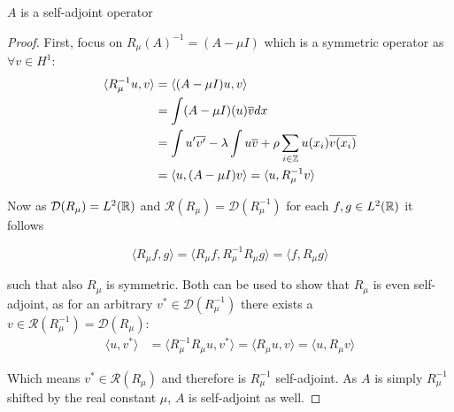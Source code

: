 \begin{theorem}
	$A$ is a self-adjoint operator
		
	\begin{proof}
		First, focus on $R_{\mu}(A)^{-1} = (A - \mu I)$ which is a symmetric operator as $\forall v \in H^{1}$:
			\begin{align*}
				\langle R_{\mu}^{-1} u, v \rangle & = \langle (A - \mu I) u, v \rangle \\
					& = \int (A - \mu I)(u) \overline{v} dx \\
					& = \int u'\overline{v'} -  \lambda \int u \overline{v} + \rho \sum_{i \in \mathbb{Z}} u(x_{i}) \overline{v(x_{i})} \\
					& = \langle u, (A - \mu I) v \rangle = \langle u,  R_{\mu}^{-1} v \rangle 
			\end{align*}

		Now as $\mathcal{D}(R_{\mu}) = L^{2}(\mathbb{R})$ and $\mathcal{R}(R_{\mu}) = \mathcal{D}(R_{\mu}^{-1})$ for each $f, g \in L^{2}(\mathbb{R})$ it follows
		
		\[  \langle R_{\mu} f, g \rangle =  \langle R_{\mu} f, R_{\mu}^{-1} R_{\mu} g \rangle = \langle f, R_{\mu} g \rangle \]
		
		such that also $R_{\mu}$ is symmetric. Both can be used to show that $R_{\mu}$ is even self-adjoint, as for an arbitrary $v^{*} \in \mathcal{D}(R_{\mu}^{-1})$ there exists a $v \in \mathcal{R}(R_{\mu}^{-1}) = \mathcal{D}(R_{\mu})$:
		\begin{align*}
			\langle u, v^{*} \rangle & = \langle R_{\mu}^{-1} R_{\mu} u , v^{*} \rangle = \langle R_{\mu} u, v \rangle  = \langle  u, R_{\mu} v \rangle 
		\end{align*}
		
		Which means $v^{*} \in \mathcal{R}(R_{\mu})$ and therefore is $R_{\mu}^{-1}$  self-adjoint. As $A$ is simply $R_{\mu}^{-1}$ shifted by the real constant $\mu$, $A$ is self-adjoint as well.		
	\end{proof}
\end{theorem}
